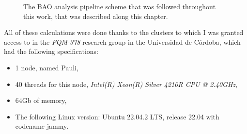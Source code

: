 \begin{figure}[b]
    \centering
    \caption[The BAO analysis pipeline schematic]{The BAO analysis pipeline scheme that was  followed throughout this work, that was described along this chapter. }
    \label{fig:pipeline}
\end{figure}
 \newpage
All of these calculations were done thanks to the clusters to which I was granted access to in the \textit{FQM-378} research group in the Universidad de Córdoba, which had the following specifications: 
\begin{itemize}
	\item 1 node, named Pauli,
\item 40 threads for this node, \textit{Intel(R) Xeon(R) Silver 4210R CPU @ 2.40GHz},
\item 64Gb of memory,
\item The following Linux version: Ubuntu 22.04.2 LTS, release 22.04 with codename jammy.
\end{itemize}
